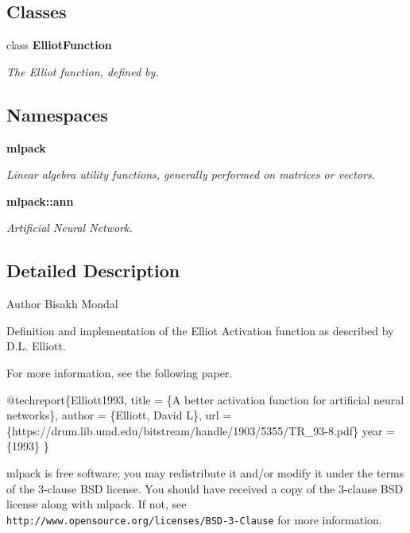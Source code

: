 \subsection*{Classes}
\begin{DoxyCompactItemize}
\item 
class \textbf{ Elliot\+Function}
\begin{DoxyCompactList}\small\item\em The Elliot function, defined by. \end{DoxyCompactList}\end{DoxyCompactItemize}
\subsection*{Namespaces}
\begin{DoxyCompactItemize}
\item 
 \textbf{ mlpack}
\begin{DoxyCompactList}\small\item\em Linear algebra utility functions, generally performed on matrices or vectors. \end{DoxyCompactList}\item 
 \textbf{ mlpack\+::ann}
\begin{DoxyCompactList}\small\item\em Artificial Neural Network. \end{DoxyCompactList}\end{DoxyCompactItemize}


\subsection{Detailed Description}
\begin{DoxyAuthor}{Author}
Bisakh Mondal
\end{DoxyAuthor}
Definition and implementation of the Elliot Activation function as described by D.\+L. Elliott.

For more information, see the following paper.


\begin{DoxyCode}
@techreport\{Elliott1993,
  title = \{A better activation \textcolor{keyword}{function} \textcolor{keywordflow}{for} artificial neural networks\},
  author = \{Elliott, David L\},
  url = \{https:\textcolor{comment}{//drum.lib.umd.edu/bitstream/handle/1903/5355/TR\_93-8.pdf\}}
  year = \{1993\}
\}
\end{DoxyCode}


mlpack is free software; you may redistribute it and/or modify it under the terms of the 3-\/clause B\+SD license. You should have received a copy of the 3-\/clause B\+SD license along with mlpack. If not, see {\tt http\+://www.\+opensource.\+org/licenses/\+B\+S\+D-\/3-\/\+Clause} for more information. 